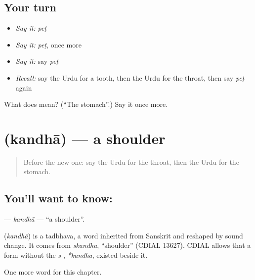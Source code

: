 \subsection*{Your turn}
\begin{itemize}
\raggedright
  \item \emph{Say it:} \emph{peṭ}
  \item \emph{Say it:} \emph{peṭ}, once more
  \item \emph{Say it:} say \emph{peṭ}
  \item \emph{Recall:} say the Urdu for a tooth, then the Urdu for the throat, then say \emph{peṭ} again
\end{itemize}

\begin{tcolorbox}[breakable,colback=teal!4,colframe=teal!35!black,title={Before you move on}]
What does  mean? (\textquotedblleft{}The stomach\textquotedblright{}.) Say it once more.
\end{tcolorbox}
\section[\texorpdfstring{\ur{کندھا} (kandhā)}{کندھا (kandhā)}]{ (kandhā) — a shoulder}

\label{lesson:UR-C39-kandha}



\begin{quote}
Before the new one: say the Urdu for the throat, then the Urdu for the stomach.
\end{quote}

\subsection*{You'll want to know: }
\textbf{} — \emph{kandhā} — \textquotedblleft{}a shoulder\textquotedblright{}.

\begin{cousinweb}
\textbf{} (\emph{kandhā}) is a tadbhava, a word inherited from Sanskrit and reshaped by sound change. It comes from \emph{skandha}, \textquotedblleft{}shoulder\textquotedblright{} (CDIAL 13627). CDIAL allows that a form without the \emph{s-}, \emph{*kandha}, existed beside it.
\end{cousinweb}

\begin{grammarlens}[title={What you've built}]
One more word for this chapter.
\end{grammarlens}

